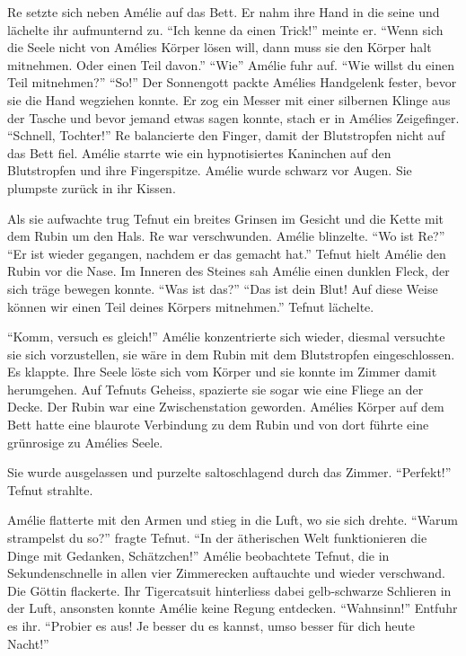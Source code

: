 \documentclass[11pt,titlepage,a5paper]{book}
\begin{document}
Re setzte sich neben Amélie auf das Bett. Er nahm ihre Hand in die seine und lächelte ihr aufmunternd zu. "`Ich kenne da einen Trick!"' meinte er. "`Wenn sich die Seele nicht von Amélies Körper lösen will, dann muss sie den Körper halt mitnehmen. Oder einen Teil davon."' "`Wie"' Amélie fuhr auf. "`Wie willst du einen Teil mitnehmen?"' "`So!"' Der Sonnengott packte Amélies Handgelenk fester, bevor sie die Hand wegziehen konnte. Er zog ein Messer mit einer silbernen Klinge aus der Tasche und bevor jemand etwas sagen konnte, stach er in Amélies Zeigefinger. "`Schnell, Tochter!"' Re balancierte den Finger, damit der Blutstropfen nicht auf das Bett fiel. Amélie starrte wie ein hypnotisiertes Kaninchen auf den Blutstropfen und ihre Fingerspitze. Amélie wurde schwarz vor Augen. Sie plumpste zurück in ihr Kissen. 

Als sie aufwachte trug Tefnut ein breites Grinsen im Gesicht und die Kette mit dem Rubin um den Hals. Re war verschwunden. Amélie blinzelte. "`Wo ist Re?"' "`Er ist wieder gegangen, nachdem er das gemacht hat."' Tefnut hielt Amélie den Rubin vor die Nase. Im Inneren des Steines sah Amélie einen dunklen Fleck, der sich träge bewegen konnte. "`Was ist das?"' "`Das ist dein Blut! Auf diese Weise können wir einen Teil deines Körpers mitnehmen."' Tefnut lächelte.

"`Komm, versuch es gleich!"' Amélie konzentrierte sich wieder, diesmal versuchte sie sich vorzustellen, sie wäre in dem Rubin mit dem Blutstropfen eingeschlossen. Es klappte. Ihre Seele löste sich vom Körper und sie konnte im Zimmer damit herumgehen. Auf Tefnuts Geheiss, spazierte sie sogar wie eine Fliege an der Decke. Der Rubin war eine Zwischenstation geworden. Amélies Körper auf dem Bett hatte eine blaurote Verbindung zu dem Rubin und von dort führte eine grünrosige zu Amélies Seele.

Sie wurde ausgelassen und purzelte saltoschlagend durch das Zimmer. "`Perfekt!"' Tefnut strahlte. 

Amélie flatterte mit den Armen und stieg in die Luft, wo sie sich drehte. "`Warum strampelst du so?"' fragte Tefnut. "`In der ätherischen Welt funktionieren die Dinge mit Gedanken, Schätzchen!"' Amélie beobachtete Tefnut, die in Sekundenschnelle in allen vier Zimmerecken auftauchte und wieder verschwand. Die Göttin flackerte. Ihr Tigercatsuit hinterliess dabei gelb-schwarze Schlieren in der Luft, ansonsten konnte Amélie keine Regung entdecken. "`Wahnsinn!"' Entfuhr es ihr. "`Probier es aus! Je besser du es kannst, umso besser für dich heute Nacht!"'
\end{document}

